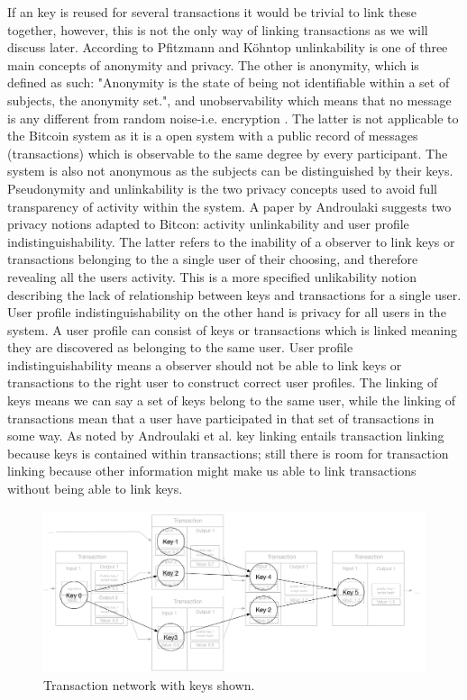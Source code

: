 If an key is reused for several transactions it would be trivial to link these together, however, this is not the only way of linking transactions as we will discuss later. According to Pfitzmann and Köhntop unlinkability is one of three main concepts of anonymity and privacy. The other is anonymity, which is defined as such: "Anonymity is the state of being not identifiable within a set of subjects, the anonymity set.", and unobservability which means that no message is any different from random noise-i.e. encryption . The latter is not applicable to the Bitcoin system as it is a open system with a public record of messages (transactions) which is observable to the same degree by every participant. The system is also not anonymous as the subjects can be distinguished by their keys.\\

Pseudonymity and unlinkability is the two privacy concepts used to avoid full transparency of activity within the system. A paper by Androulaki \cite{androulaki2013evaluating} suggests two privacy notions adapted to Bitcon: activity unlinkability and user profile indistinguishability. The latter refers to the inability of a observer to link keys or transactions belonging to the a single user of their choosing, and therefore revealing all the users activity. This is a more specified unlikability notion describing the lack of relationship between keys and transactions for a single user. User profile indistinguishability on the other hand is privacy for all users in the system. A user profile can consist of keys or transactions which is linked meaning they are discovered as belonging to the same user. User profile indistinguishability means a observer should not be able to link keys or transactions to the right user to construct correct user profiles. The linking of keys means we can say a set of keys belong to the same user, while the linking of transactions mean that a user have participated in that set of transactions in some way. As noted by Androulaki et al. key linking entails transaction linking because keys is contained within transactions; still there is room for transaction linking because other information might make us able to link transactions without being able to link keys. 
\\

\begin{figure}[h]
    \centering
    \includegraphics[width=14cm]{figures/key_network_related.png}
    \caption{ Transaction network with keys shown.}
    \label{fig:transaction_graph_keys}
\end{figure}

